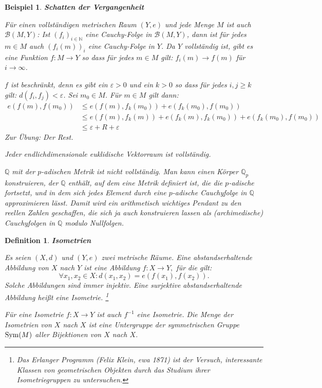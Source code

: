 \documentclass[12pt]{scrbook}   %
\newtheorem{definiX}[alles]{Definition}
\newenvironment{defini}[1]{\begin{definiX}{\bf #1}\par\rm}{\end{definiX}}
\newtheorem{bspX}[alles]{Beispiel}
\newenvironment{bsp}[1]{\begin{bspX}{\bf #1}\par\rm}{\end{bspX}}
\begin{document}
\begin{bsp} {\bf Schatten der Vergangenheit}

{\rm 
Für einen vollständigen metrischen Raum $(Y,e)$ und jede Menge $M$ ist auch $\mathcal B(M,Y)$: Ist $(f_i)_{i\in\mathbb N}$ eine Cauchy-Folge in $\mathcal B(M,Y)$, dann ist für jedes $m\in M$ auch $(f_i(m))_i$ eine Cauchy-Folge in $Y$. Da $Y$ vollständig ist, gibt es eine Funktion $f:M\to Y$ so dass für jedes $m\in M$ gilt: $f_i(m)\to f(m)$ für $i\to\infty$.

$f$ ist beschränkt, denn es gibt ein $\varepsilon > 0$ und ein $k>0$ so dass für jedes $i,j \ge k$ gilt: $d(f_i,f_j)< \varepsilon$. Sei $m_0\in M$. Für $m\in M$ gilt dann:
\begin{align*}
e(f(m), f(m_0)) &\le e(f(m),f_k(m_0)) + e(f_k(m_0), f(m_0)) \\
&\le e(f(m),f_k(m)) + e(f_k(m),f_k(m_0)) + e(f_k(m_0), f(m_0)) \\
&\le \varepsilon + R + \varepsilon 
\end{align*}
Zur Übung: Der Rest.

Jeder endlichdimensionale euklidische Vektorraum ist vollständig. 


$\mathbb Q$ mit der $p$-adischen Metrik ist nicht vollständig. Man kann einen
Körper $\mathbb Q_p$ konstruieren, der $\mathbb Q$ enthält, auf dem eine
Metrik definiert ist, die die $p$-adische fortsetzt, und in dem sich jedes 
Element durch eine $p$-adische Cauchyfolge in $\mathbb Q$ approximieren 
lässt. Damit wird ein arithmetisch wichtiges Pendant zu den reellen Zahlen 
geschaffen, die sich ja auch konstruieren lassen als (archimedische) 
Cauchyfolgen in $\mathbb Q$ modulo Nullfolgen. 
}
\end{bsp}
\begin{defini}{Isometrien}
Es seien $(X,d)$ und $(Y,e)$ zwei metrische Räume. Eine 
{\it abstandserhaltende Abbildung} von $X$ nach $Y$  ist eine Abbildung
$f:X\longrightarrow Y,$ für die gilt:
$$\forall x_1,x_2 \in X: d(x_1,x_2) = e(f(x_1),f(x_2)).$$
Solche Abbildungen sind immer injektiv. Eine surjektive abstandserhaltende
Abbildung heißt eine {\it Isometrie}.
\footnote{Das Erlanger Programm (Felix Klein, ewa 1871) ist der Versuch, interessante Klassen von geometrischen Objekten durch das Studium ihrer Isometriegruppen zu untersuchen.}

Für eine Isometrie $f:X\to Y$ ist auch $f^{-1}$ eine Isometrie.
Die Menge der Isometrien von $X$ nach $X$ ist eine Untergruppe der { 
symmetrischen Gruppe} 
${\rm Sym}(M)$ aller Bijektionen von $X$ nach $X$.
\end{defini}
\end{document}
